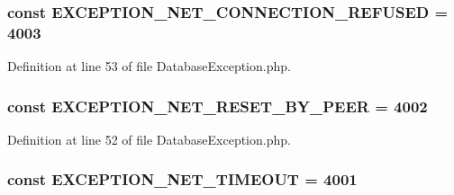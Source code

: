 \subsubsection[{E\+X\+C\+E\+P\+T\+I\+O\+N\+\_\+\+N\+E\+T\+\_\+\+C\+O\+N\+N\+E\+C\+T\+I\+O\+N\+\_\+\+R\+E\+F\+U\+S\+E\+D}]{\setlength{\rightskip}{0pt plus 5cm}const E\+X\+C\+E\+P\+T\+I\+O\+N\+\_\+\+N\+E\+T\+\_\+\+C\+O\+N\+N\+E\+C\+T\+I\+O\+N\+\_\+\+R\+E\+F\+U\+S\+E\+D = 4003}\label{class_database_exception_abbef5bf22fd6bb11a46837ba48e8bf00}


Definition at line 53 of file Database\+Exception.\+php.

\hypertarget{class_database_exception_aaa5b45b9fc8dc9eaf84c2b846fbb9cc1}{}
\subsubsection[{E\+X\+C\+E\+P\+T\+I\+O\+N\+\_\+\+N\+E\+T\+\_\+\+R\+E\+S\+E\+T\+\_\+\+B\+Y\+\_\+\+P\+E\+E\+R}]{\setlength{\rightskip}{0pt plus 5cm}const E\+X\+C\+E\+P\+T\+I\+O\+N\+\_\+\+N\+E\+T\+\_\+\+R\+E\+S\+E\+T\+\_\+\+B\+Y\+\_\+\+P\+E\+E\+R = 4002}\label{class_database_exception_aaa5b45b9fc8dc9eaf84c2b846fbb9cc1}


Definition at line 52 of file Database\+Exception.\+php.

\hypertarget{class_database_exception_a53179a0bedcb9a50567afed3ae66baaa}{}
\subsubsection[{E\+X\+C\+E\+P\+T\+I\+O\+N\+\_\+\+N\+E\+T\+\_\+\+T\+I\+M\+E\+O\+U\+T}]{\setlength{\rightskip}{0pt plus 5cm}const E\+X\+C\+E\+P\+T\+I\+O\+N\+\_\+\+N\+E\+T\+\_\+\+T\+I\+M\+E\+O\+U\+T = 4001}\label{class_database_exception_a53179a0bedcb9a50567afed3ae66baaa}


